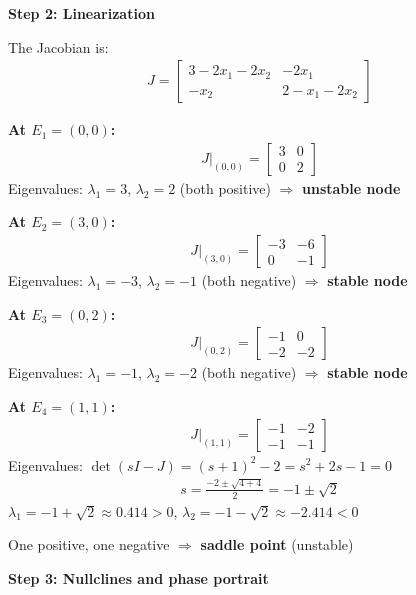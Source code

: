\documentclass[11pt,a4paper]{article}
\begin{document}
\textbf{Step 2: Linearization}

The Jacobian is:
\begin{align}
J = \begin{bmatrix} 3 - 2x_1 - 2x_2 & -2x_1 \\ -x_2 & 2 - x_1 - 2x_2 \end{bmatrix}
\end{align}

\textbf{At $E_1 = (0,0)$:}
\begin{align}
J|_{(0,0)} = \begin{bmatrix} 3 & 0 \\ 0 & 2 \end{bmatrix}
\end{align}
Eigenvalues: $\lambda_1 = 3$, $\lambda_2 = 2$ (both positive) $\Rightarrow$ \textbf{unstable node}

\textbf{At $E_2 = (3,0)$:}
\begin{align}
J|_{(3,0)} = \begin{bmatrix} -3 & -6 \\ 0 & -1 \end{bmatrix}
\end{align}
Eigenvalues: $\lambda_1 = -3$, $\lambda_2 = -1$ (both negative) $\Rightarrow$ \textbf{stable node}

\textbf{At $E_3 = (0,2)$:}
\begin{align}
J|_{(0,2)} = \begin{bmatrix} -1 & 0 \\ -2 & -2 \end{bmatrix}
\end{align}
Eigenvalues: $\lambda_1 = -1$, $\lambda_2 = -2$ (both negative) $\Rightarrow$ \textbf{stable node}

\textbf{At $E_4 = (1,1)$:}
\begin{align}
J|_{(1,1)} = \begin{bmatrix} -1 & -2 \\ -1 & -1 \end{bmatrix}
\end{align}
Eigenvalues: $\det(sI - J) = (s+1)^2 - 2 = s^2 + 2s - 1 = 0$
\begin{align}
s = \frac{-2 \pm \sqrt{4+4}}{2} = -1 \pm \sqrt{2}
\end{align}
$\lambda_1 = -1 + \sqrt{2} \approx 0.414 > 0$, $\lambda_2 = -1 - \sqrt{2} \approx -2.414 < 0$

One positive, one negative $\Rightarrow$ \textbf{saddle point} (unstable)

\textbf{Step 3: Nullclines and phase portrait}
\end{document}
